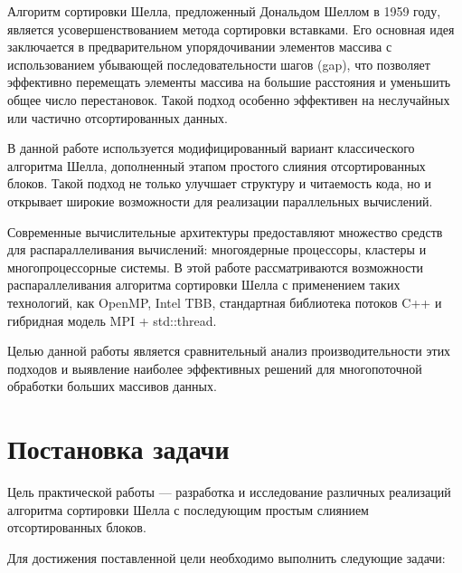 \documentclass[12pt]{article}
\begin{document}
Алгоритм сортировки Шелла, предложенный Дональдом Шеллом в 1959 году, является усовершенствованием метода сортировки вставками. Его основная идея заключается в предварительном упорядочивании элементов массива с использованием убывающей последовательности шагов (gap), что позволяет эффективно перемещать элементы массива на большие расстояния и уменьшить общее число перестановок. Такой подход особенно эффективен на неслучайных или частично отсортированных данных.

В данной работе используется модифицированный вариант классического алгоритма Шелла, дополненный этапом простого слияния отсортированных блоков. Такой подход не только улучшает структуру и читаемость кода, но и открывает широкие возможности для реализации параллельных вычислений.

Современные вычислительные архитектуры предоставляют множество средств для распараллеливания вычислений: многоядерные процессоры, кластеры и многопроцессорные системы. В этой работе рассматриваются возможности распараллеливания алгоритма сортировки Шелла с применением таких технологий, как OpenMP, Intel TBB, стандартная библиотека потоков C++ и гибридная модель MPI + std::thread.

Целью данной работы является сравнительный анализ производительности этих подходов и выявление наиболее эффективных решений для многопоточной обработки больших массивов данных.

\section{Постановка задачи}

\hspace*{1.25em}Цель практической работы — разработка и исследование различных реализаций алгоритма сортировки Шелла с последующим простым слиянием отсортированных блоков.

Для достижения поставленной цели необходимо выполнить следующие задачи:
\end{document}
